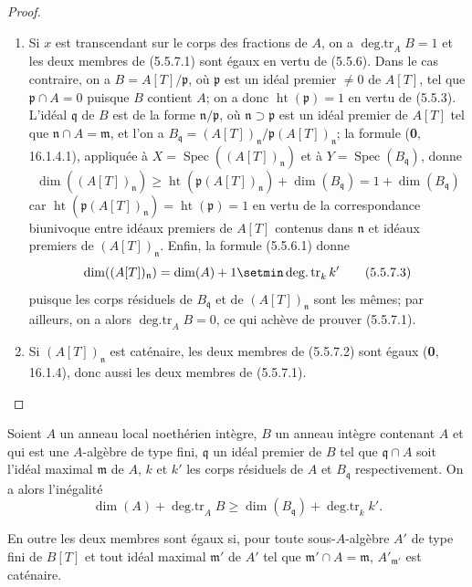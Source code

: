 \begin{proof}
\begin{enumerate}
\item[(i)] Si $x$ est transcendant sur le corps des fractions de $A$, on a
$\operatorname{deg.tr}_A B=1$ et les deux membres de (5.5.7.1) sont égaux en
vertu de (5.5.6). Dans le cas contraire, on a $B=A[T]/\mathfrak p$, où
$\mathfrak p$ est un idéal premier $\ne0$ de $A[T]$, tel que
$\mathfrak p\cap A=0$ puisque $B$ contient $A$; on a donc
$\operatorname{ht}(\mathfrak p)=1$ en vertu de (5.5.3). L'idéal
$\mathfrak q$ de $B$ est de la forme $\mathfrak n/\mathfrak p$, où
$\mathfrak n\supset\mathfrak p$ est un idéal premier de $A[T]$ tel que
$\mathfrak n\cap A=\mathfrak m$, et l'on a
$B_{\mathfrak q}=(A[T])_{\mathfrak n}/\mathfrak p(A[T])_{\mathfrak n}$;
la formule (\textbf{0}, 16.1.4.1), appliquée à
$X=\operatorname{Spec}((A[T])_{\mathfrak n})$ et à
$Y=\operatorname{Spec}(B_{\mathfrak q})$, donne
\begin{equation}
\dim((A[T])_{\mathfrak n})
\geq\operatorname{ht}(\mathfrak p(A[T])_{\mathfrak n})
+\dim(B_{\mathfrak q})=1+\dim(B_{\mathfrak q})
\tag{5.5.7.2}\label{IV.2.s5.5.7.2-fr}
\end{equation}
car $\operatorname{ht}(\mathfrak p(A[T])_{\mathfrak n})
=\operatorname{ht}(\mathfrak p)=1$ en vertu de la correspondance biunivoque
entre idéaux premiers de $A[T]$ contenus dans $\mathfrak n$ et idéaux
premiers de $(A[T])_{\mathfrak n}$. Enfin, la formule (5.5.6.1) donne
\begin{equation}
\dim((A[T])_{\mathfrak n})
=\dim(A)+1\setmin\operatorname{deg.tr}_k k'
\tag{5.5.7.3}\label{IV.2.s5.5.7.3-fr}
\end{equation}
puisque les corps résiduels de $B_{\mathfrak q}$ et de
$(A[T])_{\mathfrak n}$ sont les mêmes; par ailleurs, on a alors
$\operatorname{deg.tr}_A B=0$, ce qui achève de prouver (5.5.7.1).
\item[(ii)] Si $(A[T])_{\mathfrak n}$ est caténaire, les deux membres de
(5.5.7.2) sont égaux (\textbf{0}, 16.1.4), donc aussi les deux membres de (5.5.7.1).
\end{enumerate}
\end{proof}

\begin{theorem}
\label{IV.2.s5.5.8-fr}
Soient $A$ un anneau local noethérien intègre, $B$ un anneau intègre contenant
$A$ et qui est une $A$-algèbre de type fini, $\mathfrak q$ un idéal premier
de $B$ tel que $\mathfrak q\cap A$ soit l'idéal maximal $\mathfrak m$ de
$A$, $k$ et $k'$ les corps résiduels de $A$ et $B_{\mathfrak q}$
respectivement. On a alors l'inégalité
\begin{equation}
\dim(A)+\operatorname{deg.tr}_A B
\geq\dim(B_{\mathfrak q})+\operatorname{deg.tr}_k k'.
\tag{5.5.8.1}\label{IV.2.s5.5.8.1-fr}
\end{equation}

En outre les deux membres sont égaux si, pour toute sous-$A$-algèbre $A'$ de
type fini de $B[T]$ et tout idéal maximal $\mathfrak m'$ de $A'$ tel que
$\mathfrak m'\cap A=\mathfrak m$, $A'_{\mathfrak m'}$ est caténaire.
\end{theorem}

